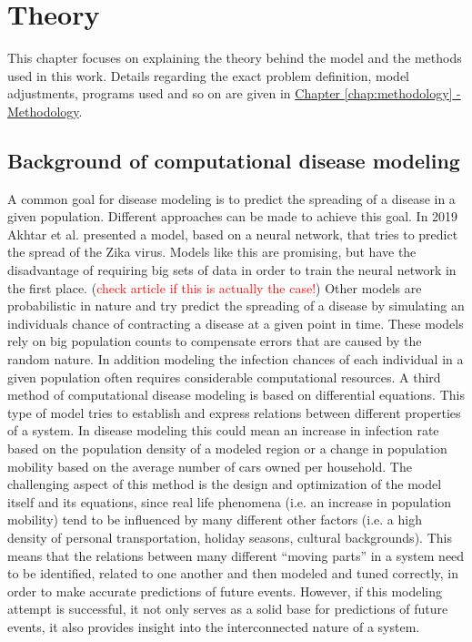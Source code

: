 
\chapter{Theory} %
This chapter focuses on explaining the theory behind the model and the methods used in this work.
Details regarding the exact problem definition, model adjustments, programs used and so on are given in
\hyperref[chap:methodology]{Chapter \ref*{chap:methodology} - Methodology}.

\label{chap:theory} %


\section{Background of computational disease modeling}
A common goal for disease modeling is to predict the spreading of a disease in a given population. Different approaches can be made to
achieve this goal. In 2019 Akhtar et al. presented a model, based on a neural network, that tries to predict the spread of the Zika virus\cite{note}.
Models like this are promising, but have the disadvantage of requiring big sets of data in order to train the neural network in the first place.
(\textcolor{red}{check article if this is actually the case!}) %
Other models are probabilistic in nature and try predict the spreading of a disease by simulating an individuals chance of contracting a
disease at a given point in time\cite{??}. These models rely on big population counts to compensate errors that are caused by the random nature.
In addition modeling the infection chances of each individual in a given population often requires considerable computational resources\cite{??}.
A third method of computational disease modeling is based on differential equations. This type of model tries to establish and express relations between different
properties of a system. In disease modeling this could mean an increase in infection rate based on the population density of a modeled region or a
change in population mobility based on the average number of cars owned per household\cite{??}. The challenging aspect of this method is the design and
optimization of the model itself and its equations, since real life phenomena (i.e. an increase in population mobility) tend to be influenced by many
different other factors (i.e. a high density of personal transportation, holiday seasons, cultural backgrounds). This means that the relations between many
different ``moving parts'' in a system need to be identified, related to one another and then modeled and tuned correctly, in order to make accurate predictions
of future events. However, if this modeling attempt is successful, it not only serves as a solid base for predictions of future events, it also provides insight
into the interconnected nature of a system.


